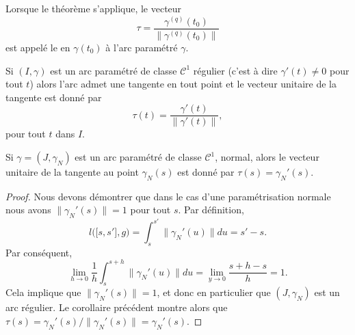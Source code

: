 Lorsque le théorème s'applique, le vecteur
\begin{equation}
    \tau=\frac{ \gamma^{(q)}(t_0) }{ \| \gamma^{(q)}(t_0) \| }
\end{equation}
est appelé le  en $\gamma(t_0)$ à l'arc paramétré $\gamma$.


\begin{corollary}       \label{CorTgSoCun}
    Si $(I,\gamma)$ est un arc paramétré de classe $\mathcal{C}^1$ régulier (c'est à dire $\gamma'(t)\neq 0$ pour tout $t$) alors l'arc admet une tangente en tout point et le vecteur unitaire de la tangente est donné par
    \begin{equation}
        \tau(t)=\frac{ \gamma'(t) }{ \| \gamma'(t) \| },
    \end{equation}
    pour tout $t$ dans $I$.
\end{corollary}

\begin{corollary}       \label{CorUnitTgtaugpnorma}
    Si $\gamma=(J,\gamma_N)$ est un arc paramétré de classe $\mathcal{C}^1$, normal, alors le vecteur unitaire de la tangente au point $\gamma_N(s)$ est donné par $\tau(s)=\gamma_N'(s)$.
\end{corollary}

\begin{proof}
    Nous devons démontrer que dans le cas d'une paramétrisation normale nous avons $\| \gamma_N'(s) \|=1$ pour tout $s$. Par définition,
    \begin{equation}
        l\big( \mathopen[ s , s' \mathclose],g \big)=\int_s^{s'}\| \gamma_N'(u) \|du=s'-s.
    \end{equation}
    Par conséquent,
    \begin{equation}
        \lim_{h\to 0} \frac{1}{ h }\int_s^{s+h}\| \gamma_N'(u) \|du=\lim_{y\to 0} \frac{ s+h-s }{ h }=1.
    \end{equation}
    Cela implique que $\| \gamma_N'(s) \|=1$, et donc en particulier que $(J,\gamma_N)$ est un arc régulier. Le corollaire précédent montre alors que $\tau(s)=\gamma_N'(s)/\| \gamma_N'(s) \|=\gamma_N'(s)$.
\end{proof}

